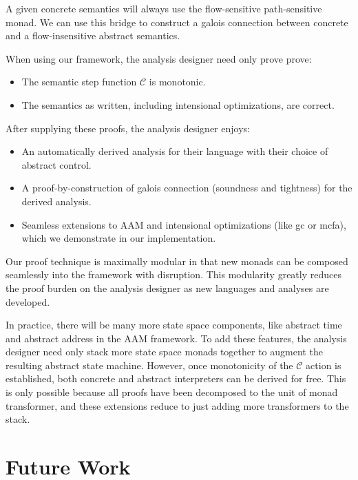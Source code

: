 \documentclass{article}
\begin{document}
A given concrete semantics will always use the flow-sensitive path-sensitive monad.
We can use this bridge to construct a galois connection between concrete and a flow-insensitive abstract semantics.

When using our framework, the analysis designer need only prove prove:
\begin{itemize}
\item The semantic step function $𝒞$ is monotonic.
\item The semantics as written, including intensional optimizations, are correct.
\end{itemize}
After supplying these proofs, the analysis designer enjoys:
\begin{itemize}
\item An automatically derived analysis for their language with their choice of abstract control.
\item A proof-by-construction of galois connection (soundness and tightness) for the derived analysis.
\item Seamless extensions to AAM and intensional optimizations (like gc or mcfa), which we demonstrate in our implementation.
\end{itemize}

Our proof technique is maximally modular in that new monads can be composed seamlessly into the framework with disruption.
This modularity greatly reduces the proof burden on the analysis designer as new languages and analyses are developed.

In practice, there will be many more state space components, like abstract time and abstract address in the AAM framework.
To add these features, the analysis designer need only stack more state space monads together to augment the resulting abstract state machine.
However, once monotonicity of the $𝒞$ action is established, both concrete and abstract interpreters can be derived for free.
This is only possible because all proofs have been decomposed to the unit of monad transformer, and these extensions reduce to just adding more transformers to the stack.


\section{Future Work}
\label{FutureWork}
\end{document}
